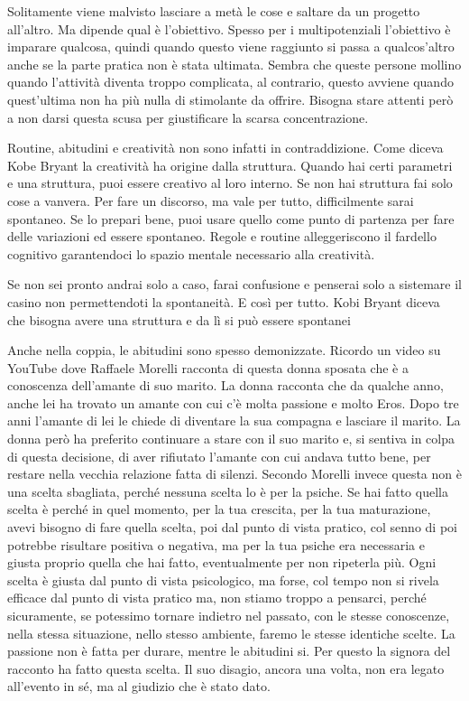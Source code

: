 \documentclass[12pt]{book} %
\begin{document}
\begin{mdframed}[linewidth=1pt]
Solitamente viene malvisto lasciare a metà le cose e saltare da un progetto all'altro. Ma dipende
qual è l'obiettivo. Spesso per i multipotenziali l'obiettivo è imparare
qualcosa, quindi quando questo viene raggiunto si passa a qualcos'altro anche se la parte pratica
non è stata ultimata. Sembra che queste persone mollino quando l'attività diventa troppo
complicata, al contrario, questo avviene quando quest'ultima non ha più nulla di stimolante da
offrire. Bisogna stare attenti però a non darsi questa scusa per giustificare la scarsa concentrazione.

Routine, abitudini e creatività non sono infatti in contraddizione. Come diceva Kobe Bryant la creatività ha origine
dalla struttura. Quando hai certi parametri e una struttura, puoi essere creativo al loro interno. Se non hai struttura
fai solo cose a vanvera. Per fare un discorso, ma vale per tutto, difficilmente sarai spontaneo. Se lo prepari bene, puoi usare quello come punto di partenza per fare delle variazioni ed essere spontaneo. Regole e routine alleggeriscono il fardello cognitivo garantendoci lo spazio mentale
necessario alla creatività.

 Se non sei pronto andrai solo a caso, farai confusione e penserai solo a sistemare il casino non permettendoti la spontaneità. E così per tutto. Kobi Bryant diceva che bisogna avere una struttura e da lì si può essere spontanei

Anche nella coppia, le abitudini sono spesso demonizzate. Ricordo un video su YouTube dove Raffaele Morelli racconta di
questa donna sposata che è a conoscenza dell'amante di suo marito. La donna racconta che da
qualche anno, anche lei ha trovato un amante con cui c'è molta passione e molto Eros. Dopo tre anni l'amante di lei le
chiede di diventare la sua compagna e lasciare il marito. La donna però ha preferito continuare a stare con il suo
marito e, si sentiva in colpa di questa decisione, di aver rifiutato l'amante con cui andava tutto
bene, per restare nella vecchia relazione fatta di silenzi. Secondo Morelli invece questa non è una scelta sbagliata,
perché nessuna scelta lo è per la psiche. Se hai fatto quella scelta è perché in quel momento, per la tua crescita, per
la tua maturazione, avevi bisogno di fare quella scelta, poi dal punto di vista pratico, col senno di poi potrebbe
risultare positiva o negativa, ma per la tua psiche era necessaria e giusta proprio quella che hai fatto, eventualmente
per non ripeterla più. Ogni scelta è giusta dal punto di vista psicologico, ma forse, col tempo non si rivela efficace
dal punto di vista pratico ma, non stiamo troppo a pensarci, perché sicuramente, se potessimo tornare indietro nel
passato, con le stesse conoscenze, nella stessa situazione, nello stesso ambiente, faremo le stesse identiche scelte.
La passione non è fatta per durare, mentre le abitudini si. Per questo la signora del racconto ha fatto questa scelta.
Il suo disagio, ancora una volta, non era legato all'evento in sé, ma al giudizio che è stato
dato.


\end{mdframed}
\end{document}
